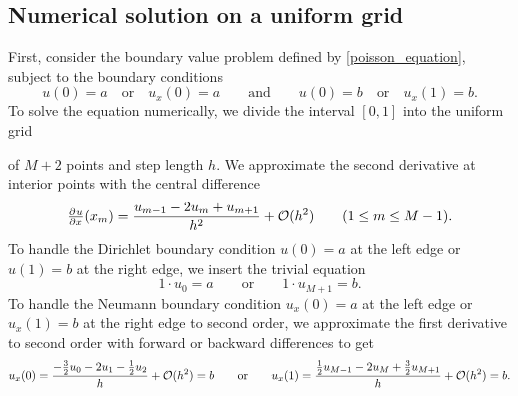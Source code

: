 \subsection{Numerical solution on a uniform grid}

First, consider the boundary value problem defined by \cref{poisson_equation}, subject to the boundary conditions
\begin{equation*}
u(0) = a \quad \text{or} \quad u_x(0) = a \qquad \text{and} \qquad u(0) = b \quad \text{or} \quad u_x(1) = b.
\end{equation*}
To solve the equation numerically, we divide the interval $[0, 1]$ into the uniform grid 
\begin{center}
\end{center}
of $M+2$ points and step length $h$.
We approximate the second derivative at interior points with the central difference
\begin{equation*}
\pd{u}{x}(x_m) = \frac{u_{m-1}-2u_{m}+u_{m+1}}{h^2} + \Oh(h^2) \qquad (1 \leq m \leq M-1).
\end{equation*}
To handle the Dirichlet boundary condition $u(0) = a$ at the left edge or $u(1) = b$ at the right edge, we insert the trivial equation
\begin{equation*}
1 \cdot u_0 = a \qquad \text{or} \qquad 1 \cdot u_{M+1} = b.
\end{equation*}
To handle the Neumann boundary condition $u_x(0) = a$ at the left edge or $u_x(1) = b$ at the right edge to second order, we approximate the first derivative to second order with forward or backward differences to get
\begin{equation*}
u_x(0) = \frac{-\frac{3}{2}u_{0}-2u_1-\frac{1}{2}u_{2}}{h} + \mathcal{O}(h^2) = b \qquad \text{or} \qquad u_x(1) = \frac{\frac{1}{2}u_{M-1}-2u_M+\frac{3}{2}u_{M+1}}{h} + \mathcal{O}(h^2) = b.
\end{equation*}
